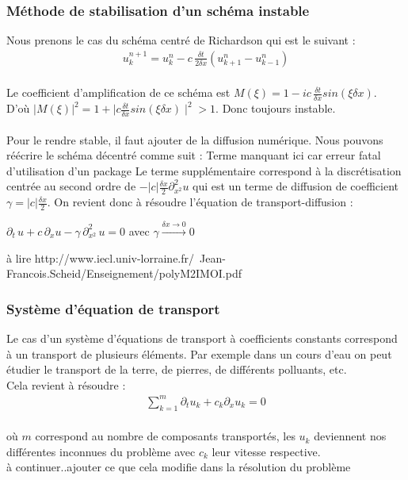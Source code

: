 \documentclass[12pt]{article}
\begin{document}
\subsubsection{Méthode de stabilisation d'un schéma instable}
\noindent Nous prenons le cas du schéma centré de Richardson qui est le suivant :
\begin{eqnarray}
         u_k^{n+1} = u_k^n - c \, \frac{\delta t}{2\delta x}(u_{k+1}^n - u_{k-1}^n)
\end{eqnarray}
\\
Le coefficient d’amplification de ce schéma est $M(\xi) = 1 - ic\,\displaystyle \frac{\delta t}{\delta x} sin(\xi \delta x)$.
\\D'où $|M(\xi)|^2 = 1 + \mid c\displaystyle\frac{\delta t}{\delta x} sin(\xi \delta x)\mid^2 > 1$. Donc toujours instable.\\\\
Pour le rendre stable, il faut ajouter de la diffusion numérique. Nous pouvons réécrire le schéma décentré comme suit :
Terme manquant ici car erreur fatal d'utilisation d'un package
Le terme supplémentaire correspond à la discrétisation centrée au second ordre de $\displaystyle -|c|\frac{\delta x}{2}\partial_{x^2}^2 u$ qui est un terme de diffusion de coefficient $\displaystyle \gamma =  |c|\frac{\delta x}{2}.$ On revient donc à résoudre l'équation de transport-diffusion :
\begin{center}
   $\displaystyle \partial_t \,u + c\, \partial_x u - \gamma \, \partial_{x^2}^2 \, u = 0$ avec $\displaystyle \gamma \xrightarrow{\delta x \rightarrow 0} 0$ 
\end{center}
à lire
http://www.iecl.univ-lorraine.fr/~Jean-Francois.Scheid/Enseignement/polyM2IMOI.pdf
\subsubsection{Système d'équation de transport}
Le cas d'un système d'équations de transport à coefficients constants correspond à un transport de plusieurs éléments. Par exemple dans un cours d'eau on peut étudier le transport de la terre, de pierres, de différents polluants, etc.
\\Cela revient à résoudre :
\\
\begin{eqnarray}
        \displaystyle\sum_{k=1}^m \partial_t u_k + c_k\partial_x u_k = 0
\end{eqnarray}
\\
où $m$ correspond au nombre de composants transportés, les $u_k$ deviennent nos différentes inconnues du problème avec $c_k$ leur vitesse respective.
\\
 à continuer..ajouter ce que cela modifie dans la résolution du problème
 
\end{document}
